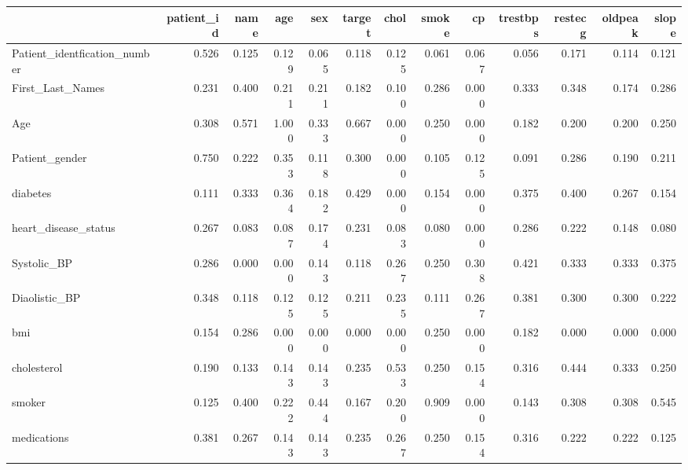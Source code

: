 \begin{tabular}{lrrrrrrrrrrrr}
\toprule
 & patient_id & name & age & sex & target & chol & smoke & cp & trestbps & restecg & oldpeak & slope \\
\midrule
Patient_identfication_number & 0.526 & 0.125 & 0.129 & 0.065 & 0.118 & 0.125 & 0.061 & 0.067 & 0.056 & 0.171 & 0.114 & 0.121 \\
First_Last_Names & 0.231 & 0.400 & 0.211 & 0.211 & 0.182 & 0.100 & 0.286 & 0.000 & 0.333 & 0.348 & 0.174 & 0.286 \\
Age & 0.308 & 0.571 & 1.000 & 0.333 & 0.667 & 0.000 & 0.250 & 0.000 & 0.182 & 0.200 & 0.200 & 0.250 \\
Patient_gender & 0.750 & 0.222 & 0.353 & 0.118 & 0.300 & 0.000 & 0.105 & 0.125 & 0.091 & 0.286 & 0.190 & 0.211 \\
diabetes & 0.111 & 0.333 & 0.364 & 0.182 & 0.429 & 0.000 & 0.154 & 0.000 & 0.375 & 0.400 & 0.267 & 0.154 \\
heart_disease_status & 0.267 & 0.083 & 0.087 & 0.174 & 0.231 & 0.083 & 0.080 & 0.000 & 0.286 & 0.222 & 0.148 & 0.080 \\
Systolic_BP & 0.286 & 0.000 & 0.000 & 0.143 & 0.118 & 0.267 & 0.250 & 0.308 & 0.421 & 0.333 & 0.333 & 0.375 \\
Diaolistic_BP & 0.348 & 0.118 & 0.125 & 0.125 & 0.211 & 0.235 & 0.111 & 0.267 & 0.381 & 0.300 & 0.300 & 0.222 \\
bmi & 0.154 & 0.286 & 0.000 & 0.000 & 0.000 & 0.000 & 0.250 & 0.000 & 0.182 & 0.000 & 0.000 & 0.000 \\
cholesterol & 0.190 & 0.133 & 0.143 & 0.143 & 0.235 & 0.533 & 0.250 & 0.154 & 0.316 & 0.444 & 0.333 & 0.250 \\
smoker & 0.125 & 0.400 & 0.222 & 0.444 & 0.167 & 0.200 & 0.909 & 0.000 & 0.143 & 0.308 & 0.308 & 0.545 \\
medications & 0.381 & 0.267 & 0.143 & 0.143 & 0.235 & 0.267 & 0.250 & 0.154 & 0.316 & 0.222 & 0.222 & 0.125 \\
\bottomrule
\end{tabular}
